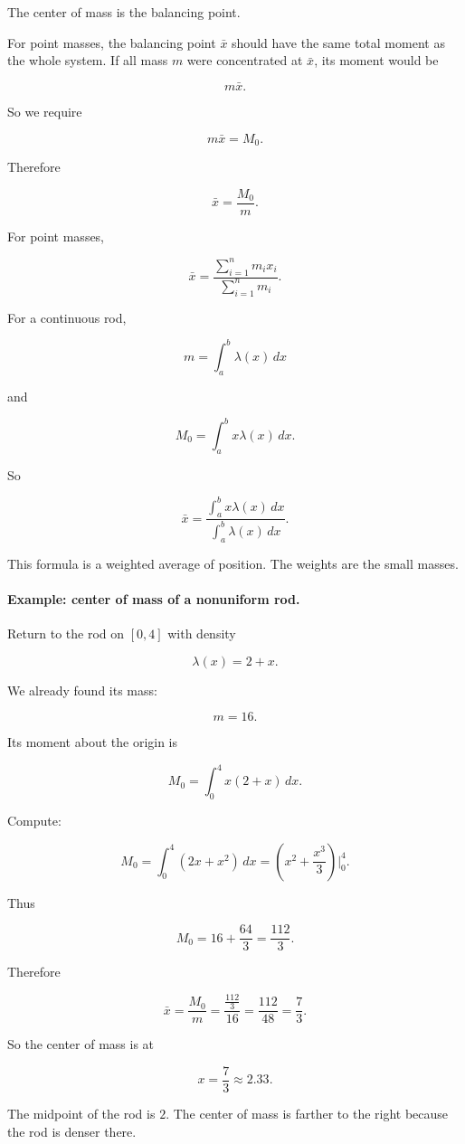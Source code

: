 The center of mass is the balancing point.

For point masses, the balancing point \(\bar x\) should have the same total moment
as the whole system.  If all mass \(m\) were concentrated at \(\bar x\), its moment
would be

\[
m\bar x.
\]

So we require

\[
m\bar x=M_0.
\]

Therefore

\[
\boxed{
\bar x=\frac{M_0}{m}.
}
\]

For point masses,

\[
\boxed{
\bar x=
\frac{\sum_{i=1}^n m_i x_i}{\sum_{i=1}^n m_i}.
}
\]

For a continuous rod,

\[
m=\int_a^b \lambda(x)\,dx
\]

and

\[
M_0=\int_a^b x\lambda(x)\,dx.
\]

So

\[
\boxed{
\bar x
=
\frac{\int_a^b x\lambda(x)\,dx}{\int_a^b \lambda(x)\,dx}.
}
\]

This formula is a weighted average of position.  The weights are the small masses.

\paragraph{Example: center of mass of a nonuniform rod.}
Return to the rod on \([0,4]\) with density

\[
\lambda(x)=2+x.
\]

We already found its mass:

\[
m=16.
\]

Its moment about the origin is

\[
M_0=\int_0^4 x(2+x)\,dx.
\]

Compute:

\[
M_0=\int_0^4 (2x+x^2)\,dx
=
\left(x^2+\frac{x^3}{3}\right)\Big|_0^4.
\]

Thus

\[
M_0=16+\frac{64}{3}=\frac{112}{3}.
\]

Therefore

\[
\bar x=\frac{M_0}{m}
=
\frac{\frac{112}{3}}{16}
=
\frac{112}{48}
=
\boxed{\frac73}.
\]

So the center of mass is at

\[
x=\frac73\approx2.33.
\]

The midpoint of the rod is \(2\).  The center of mass is farther to the right because
the rod is denser there.

